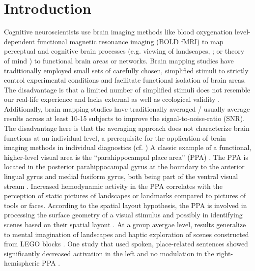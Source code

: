 \documentclass[english]{article}
\begin{document}
\section{Introduction}
Cognitive neuroscientists use brain imaging methods like blood oxygenation level-dependent functional magnetic resonance imaging (BOLD fMRI) to map perceptual and cognitive brain processes (e.g. viewing of landscapes, \citep{epstein1998ppa}; or theory of mind \citep{spunt2014validating}) to functional brain areas or networks. Brain mapping studies have traditionally employed small sets of carefully chosen, simplified stimuli to strictly control experimental conditions and facilitate functional isolation of brain areas.
The disadvantage is that a limited number of simplified stimuli does not resemble our real-life experience and lacks external \citep{westfall2016fixing} as well as ecological validity \citep{hasson2004intersubject}.
Additionally, brain mapping studies have traditionally averaged / usually average results across at least 10-15 subjects to improve the signal-to-noise-ratio (SNR). The disadvantage here is that the averaging approach does not  characterize brain functions at an individual level, a prerequisite for the application of brain imaging methods in individual diagnostics (cf. \citep{dubois2016building})
A classic example of a functional, higher-level visual area is the ``parahippocampal place area'' (PPA) \citep{epstein1998ppa, epstein1999parahippocampal}.
The PPA is located in the posterior parahippocampal gyrus at the boundary to the anterior lingual gyrus and medial fusiform gyrus, both being part of the ventral visual stream \citep{mishkin1982contribution, goodale1992separate}.
Increased hemodynamic activity in the PPA correlates with the perception of static pictures of landscapes or landmarks compared to pictures of tools or faces.
According to the spatial layout hypothesis, the PPA is involved in processing the surface geometry of a visual stimulus and possibly in identifying scenes based on their spatial layout \citep{epstein2010reliable}.
At a group avergae level, results generalize to mental imagination of landscapes \citep{ocraven2000mental} and haptic exploration of scenes constructed from LEGO blocks \citep{wolbers2011modality}.
One study that used spoken, place-related sentences showed significantly decreased activation in the left and no modulation in the right-hemispheric PPA \citep{aziz2008modulation}.
\end{document}

